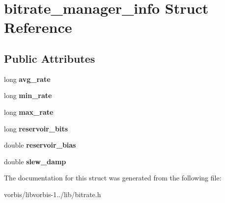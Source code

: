 \hypertarget{structbitrate__manager__info}{\section{bitrate\+\_\+manager\+\_\+info Struct Reference}
\label{structbitrate__manager__info}
}
\subsection*{Public Attributes}
\begin{DoxyCompactItemize}
\item 
\hypertarget{structbitrate__manager__info_a641dc9820b98f174f73cd36b2769127c}{long {\bfseries avg\+\_\+rate}}\label{structbitrate__manager__info_a641dc9820b98f174f73cd36b2769127c}

\item 
\hypertarget{structbitrate__manager__info_a70b89ca96ddf87dc93eac879429c0d5d}{long {\bfseries min\+\_\+rate}}\label{structbitrate__manager__info_a70b89ca96ddf87dc93eac879429c0d5d}

\item 
\hypertarget{structbitrate__manager__info_a8694ec6266069b0e3521793ecd4e59d2}{long {\bfseries max\+\_\+rate}}\label{structbitrate__manager__info_a8694ec6266069b0e3521793ecd4e59d2}

\item 
\hypertarget{structbitrate__manager__info_ac3474e0e648e661ac5e4b0d8a434fa32}{long {\bfseries reservoir\+\_\+bits}}\label{structbitrate__manager__info_ac3474e0e648e661ac5e4b0d8a434fa32}

\item 
\hypertarget{structbitrate__manager__info_a7e3ab7c2b92ee477615a6308952f3005}{double {\bfseries reservoir\+\_\+bias}}\label{structbitrate__manager__info_a7e3ab7c2b92ee477615a6308952f3005}

\item 
\hypertarget{structbitrate__manager__info_a8b2831842978c4a426f63241ec17d030}{double {\bfseries slew\+\_\+damp}}\label{structbitrate__manager__info_a8b2831842978c4a426f63241ec17d030}

\end{DoxyCompactItemize}


The documentation for this struct was generated from the following file\+:\begin{DoxyCompactItemize}
\item 
vorbis/libvorbis-\/1../lib/bitrate.\+h\end{DoxyCompactItemize}
